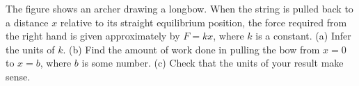The figure shows an archer drawing a longbow. When the string
is pulled back to a distance $x$ relative to its straight equilibrium position,
the force required from the right hand is given approximately by $F=kx$, where
$k$ is a constant. (a) 
Infer the units of $k$.
(b) Find the amount of work done in pulling the bow from $x=0$ to $x=b$, where
$b$ is some number.
(c) Check that the units of your result make sense.

